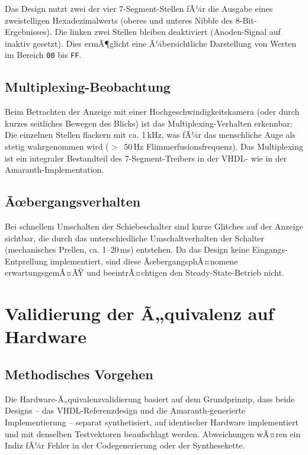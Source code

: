 ﻿\documentclass[12pt,a4paper]{report}
\begin{document}
Das Design nutzt zwei der vier 7-Segment-Stellen fÃ¼r die Ausgabe eines zweistelligen Hexadezimalwerts (oberes und unteres Nibble des 8-Bit-Ergebnisses). Die linken zwei Stellen bleiben deaktiviert (Anoden-Signal auf inaktiv gesetzt). Dies ermÃ¶glicht eine Ã¼bersichtliche Darstellung von Werten im Bereich \texttt{00} bis \texttt{FF}.

\subsection{Multiplexing-Beobachtung}
\label{subsec:multiplexing}

Beim Betrachten der Anzeige mit einer Hochgeschwindigkeitskamera (oder durch kurzes seitliches Bewegen des Blicks) ist das Multiplexing-Verhalten erkennbar: Die einzelnen Stellen flackern mit ca. 1\,kHz, was fÃ¼r das menschliche Auge als stetig wahrgenommen wird ($>$~50\,Hz Flimmerfusionsfrequenz). Das Multiplexing ist ein integraler Bestandteil des 7-Segment-Treibers in der VHDL- wie in der Amaranth-Implementation.

\subsection{Ãœbergangsverhalten}
\label{subsec:uebergangsverhalten}

Bei schnellem Umschalten der Schiebeschalter sind kurze Glitches auf der Anzeige sichtbar, die durch das unterschiedliche Umschaltverhalten der Schalter (mechanisches Prellen, ca. 1--20\,ms) entstehen. Da das Design keine Eingangs-Entprellung implementiert, sind diese ÃœbergangsphÃ¤nomene erwartungsgemÃ¤ÃŸ und beeintrÃ¤chtigen den Steady-State-Betrieb nicht.

\section{Validierung der Ã„quivalenz auf Hardware}
\label{sec:aequivalenz_hardware}

\subsection{Methodisches Vorgehen}
\label{subsec:methodik_aequivalenz}

Die Hardware-Ã„quivalenzvalidierung basiert auf dem Grundprinzip, dass beide Designs -- das VHDL-Referenzdesign und die Amaranth-generierte Implementierung -- separat synthetisiert, auf identischer Hardware implementiert und mit denselben Testvektoren beaufschlagt werden. Abweichungen wÃ¤ren ein Indiz fÃ¼r Fehler in der Codegenerierung oder der Synthesekette.
\end{document}
